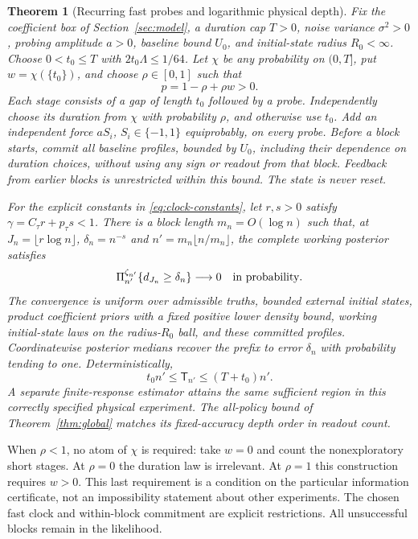 \documentclass[11pt,reqno]{amsart}
\newtheorem{theorem}{Theorem}[section]
\theoremstyle{remark}\newtheorem{remark}[theorem]{Remark}
\begin{document}
\begin{theorem}[Recurring fast probes and logarithmic physical depth]
\label{thm:main}
Fix the coefficient box of Section~\ref{sec:model}, a duration cap $T>0$,
noise variance $\sigma^2>0$, probing amplitude $a>0$, baseline bound $U_0$,
and initial-state radius $R_0<\infty$. Choose $0<t_0\le T$ with
$2t_0\Lambda\le1/64$. Let $\chi$ be any probability on $(0,T]$, put
$w=\chi(\{t_0\})$, and choose $\rho\in[0,1]$ such that
\[
 p=1-\rho+\rho w>0.
\]
Each stage consists of a gap of length $t_0$ followed by a probe. Independently
choose its duration from $\chi$ with probability $\rho$, and otherwise use
$t_0$. Add an independent force $aS_i$, $S_i\in\{-1,1\}$ equiprobably,
on every probe. Before a block starts, commit all baseline profiles, bounded
by $U_0$, including their dependence on duration choices, without using any
sign or readout from that block. Feedback from earlier blocks is unrestricted
within this bound. The state is never reset.

For the explicit constants in \eqref{eq:clock-constants}, let $r,s>0$ satisfy
$\gamma=C_\tau r+p_\tau s<1$. There is a block length $m_n=O(\log n)$ such
that, at $J_n=\lfloor r\log n\rfloor$, $\delta_n=n^{-s}$ and
$n'=m_n\lfloor n/m_n\rfloor$, the complete working posterior satisfies
\[
 \Pi_{n'}^{\zeta_{n'}}\{d_{J_n}\ge\delta_n\}\longrightarrow0
 \quad\hbox{in probability}.
\]
The convergence is uniform over admissible truths, bounded external initial
states, product coefficient priors with a fixed positive lower density bound,
working initial-state laws on the radius-$R_0$ ball, and these committed
profiles. Coordinatewise posterior medians recover the prefix to error
$\delta_n$ with probability tending to one. Deterministically,
\[
 t_0n'\le\mathsf T_{n'}\le(T+t_0)n'.
\]
A separate finite-response estimator attains the same sufficient region in
this correctly specified physical experiment. The all-policy bound of
Theorem~\ref{thm:global} matches its fixed-accuracy depth order in readout count.
\end{theorem}

When $\rho<1$, no atom of $\chi$ is required: take $w=0$ and count the
nonexploratory short stages. At $\rho=0$ the duration law is irrelevant.
At $\rho=1$ this construction requires $w>0$. This last requirement is a
condition on the particular information certificate, not an impossibility
statement about other experiments. The chosen fast clock and within-block
commitment are explicit restrictions. All unsuccessful blocks remain in the
likelihood.
\end{document}
